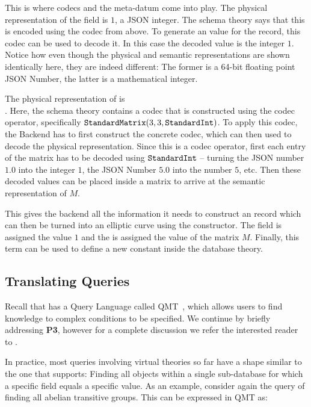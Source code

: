 This is where codecs and the  meta-datum come into play. 
The physical representation of the  field is $1$, a JSON integer. 
The schema theory says that this is encoded using the  codec from above. 
To generate an \mmt value for the record, this codec can be used to decode it. 
In this case the decoded value is the integer $1$. 
Notice how even though the physical and semantic representations are shown identically here, they are indeed different: The former is a 64-bit floating point JSON Number, the latter is a mathematical integer. 

The physical representation of  is
\\\noindent\inlinecode{[[1.0,5.0,25.0],[5.0,1.0,5.0],[25.0,5.0,1.0]]}. 
Here, the schema theory contains a codec that is constructed using the  codec operator, specifically $\plaintt{StandardMatrix}(3, 3, \plaintt{StandardInt})$. 
To apply this codec, the Backend has to first construct the concrete codec, which can then used to decode the physical representation. 
Since this is a codec operator, first each entry of the matrix has to be decoded using $\plaintt{StandardInt}$ -- turning the JSON number $1.0$ into the integer $1$, the JSON Number $5.0$ into the number $5$, etc. 
Then these decoded values can be placed inside a matrix to arrive at the semantic representation of $M$. 

This gives the backend all the information it needs to construct an \mmt record which can then be turned into an elliptic curve using the  constructor. 
The  field is assigned the value $1$ and the  is assigned the value of the matrix $M$. 
Finally, this \mmt term can be used to define a new constant inside the database theory.

\subsection{Translating Queries}
Recall that \mmt has a Query Language called QMT~\cite{Rabe:qlfml12}, which allows users to find knowledge to complex conditions to be specified. 
We continue by briefly addressing \textbf{P3}, however for a complete discussion we refer the interested reader to \cite{twiesing:msc17}. 

In practice, most queries involving virtual theories so far have a shape similar to the one that \lmfdb supports: 
Finding all objects within a single sub-database for which a specific field equals a specific value. 
As an example, consider again the query of finding all abelian transitive groups. 
This can be expressed in QMT as:

